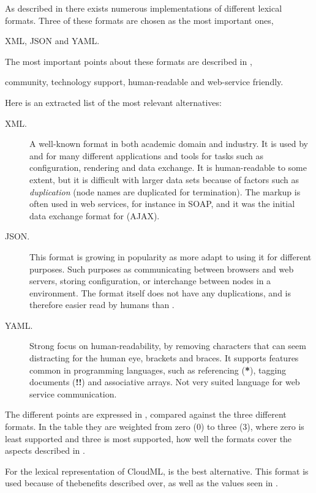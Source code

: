 As described in  there exists numerous implementations of different lexical formats.
Three of these formats are chosen as the most important ones,
\begin{ii}
  \iitem XML,
  \iitem JSON and
  \iitem YAML.
\end{ii}
The most important points about these formats are described in ,
\ie
\begin{ii}
  \iitem community,
  \iitem technology support,
  \iitem human-readable and
  \iitem web-service friendly.
\end{ii}
Here is an extracted list of the most relevant alternatives:
\begin{description}
  \item[XML.] A well-known format in both academic domain and industry.
    It is used by and for many different applications and tools for tasks such as configuration,
    rendering and data exchange.
    It is human-readable to some extent, but it is difficult with larger data sets because
    of factors such as \emph{duplication} (node names are duplicated for termination). 
    The markup is often used in web services, for instance in SOAP, 
    and it was the initial data exchange format for  (AJAX).
  \item[JSON.] This format is growing in popularity as more adapt to using it for
    different purposes.
    Such purposes as communicating between browsers and web servers, storing configuration,
    or interchange between nodes in a  environment.
    The format itself does not have any duplications, and is therefore easier read by humans
    than .
  \item[YAML.] Strong focus on human-readability, by removing characters that can seem
    distracting for the human eye, \eg brackets and braces.
    It supports features common in programming languages, such as
    \eg referencing (\textbf{*}), tagging documents (\textbf{!!}) and associative arrays.
    Not very suited language for web service communication.
\end{description}
The different points are expressed in , 
compared against the three different formats.
In the table they are weighted from zero ($0$) to three ($3$),
where zero is least supported and three is most supported,
\ie how well the formats cover the aspects described in .

For the lexical representation of CloudML,  is the best alternative.
This format is used because of thebenefits described over,
as well as the values seen in .


